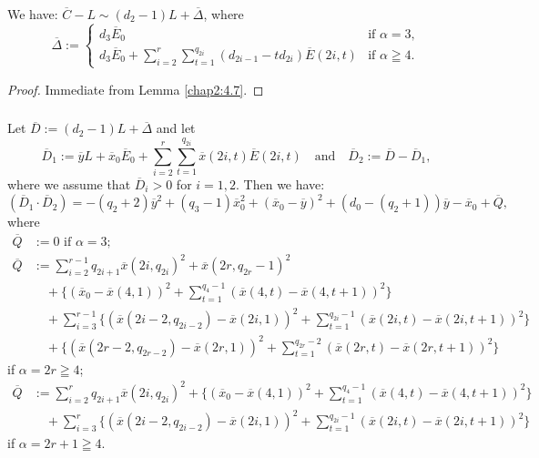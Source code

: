 \subsubsection{}\label{chap2:4.9.1}
\begin{lemma*}
  We have: $\overline{C}-L\sim(d_{2}-1)L+\overline{\Delta}$, where
  $$
  \overline{\Delta}:=
  \begin{cases}
    d_{3}\overline{E}_{0} & \text{if }\alpha=3,\\
    d_{3}\overline{E}_{0}
    +\sum^{r}_{i=2}\sum^{q_{2i}}_{t=1}(d_{2i-1}-td_{2i})\overline{E}(2i,t)
    & \text{if } \alpha\geqq 4.
  \end{cases}
  $$
\end{lemma*}

\begin{proof}
Immediate from Lemma \ref{chap2:4.7}.
\end{proof}

\subsubsection{}\label{chap2:4.9.2}
\begin{lemma*}
  Let $\overline{D}:=(d_{2}-1)L+\overline{\Delta}$ and let
  $$
  \overline{D}_{1}:=\overline{y}L+\overline{x}_{0}\overline{E}_{0}+\sum^{r}_{i=2}\sum^{q_{2i}}_{t=1}\overline{x}(2i,t)\overline{E}(2i,t)\quad\text{and}\quad
  \overline{D}_{2}:=\overline{D}-\overline{D}_{1}, 
  $$
  where we assume that $\overline{D}_{i}>0$ for $i=1,2$. Then we have:
  $$
  (\overline{D}_{1}\cdot
  \overline{D}_{2})=-(q_{2}+2)\overline{y}^{2}+(q_{3}-1)\overline{x}^{2}_{0}+(\overline{x}_{0}-\overline{y})^{2}+(d_{0}-(q_{2}+1))\overline{y}-\overline{x}_{0}+\overline{Q}, 
  $$
  where\pageoriginale\
  \begin{align*}
    \overline{Q} &:= 0 \text{ \  if \ }\alpha=3;\\
    \overline{Q} &:=
    \sum^{r-1}_{i=2}q_{2i+1}\overline{x}(2i,q_{2i})^{2}+\overline{x}
    (2r,q_{2r}-1)^{2}\\ 
    &\quad +\{(\overline{x}_{0}-\overline{x}(4,1))^{2} +
    \sum^{q_{4}-1}_{t=1}(\overline{x}(4,t)-\overline{x}(4,t+1))^{2}\}\\ 
    &\quad +\sum^{r-1}_{i=3}\{(\overline{x}(2i-2,q_{2i-2})-
    \overline{x}(2i,1))^{2}+\sum^{q_{2i}-1}_{t=1} (\overline{x}(2i,t)
    - \overline{x}(2i,t+1))^{2}\}\\ 
    &\quad +\{(\overline{x}(2r-2,q_{2r-2})- \overline{x}(2r,1))^{2} +
    \sum^{q_{2r}-2}_{t=1}(\overline{x}(2r,t)-\overline{x}(2r,t+1))^{2}\} 
  \end{align*}
  if $\alpha=2r\geqq 4$;
  \begin{align*}
    \overline{Q} &:=
    \sum^{r}_{i=2}q_{2i+1}\overline{x}(2i,q_{2i})^{2}+\{(\overline{x}_{0}
    - \overline{x}(4,1))^{2}+\sum^{q_{4}-1}_{t=1}(\overline{x}(4,t) -
    \overline{x}(4,t+1))^{2}\}\\ 
    &\quad
    +\sum^{r}_{i=3}\{(\overline{x}(2i-2,q_{2i-2})-\overline{x}(2i,1))^{2}+\sum^{q_{2i}-1}_{t=1}(\overline{x}(2i,t)-\overline{x}(2i,t+1))^{2}\} 
  \end{align*}
  if $\alpha=2r+1\geqq 4$.
\end{lemma*}


